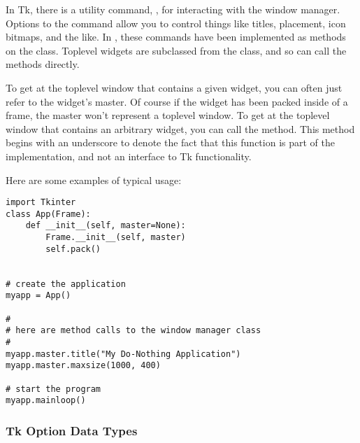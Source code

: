 In Tk, there is a utility command, , for interacting with the
window manager.  Options to the  command allow you to control
things like titles, placement, icon bitmaps, and the like.  In
, these commands have been implemented as methods
on the  class.  Toplevel widgets are subclassed from the
 class, and so can call the  methods directly.


To get at the toplevel window that contains a given widget, you can
often just refer to the widget's master.  Of course if the widget has
been packed inside of a frame, the master won't represent a toplevel
window.  To get at the toplevel window that contains an arbitrary
widget, you can call the  method.  This
method begins with an underscore to denote the fact that this function
is part of the implementation, and not an interface to Tk functionality.

Here are some examples of typical usage:

\begin{verbatim}
import Tkinter
class App(Frame):
    def __init__(self, master=None):
        Frame.__init__(self, master)
        self.pack()


# create the application
myapp = App()

#
# here are method calls to the window manager class
#
myapp.master.title("My Do-Nothing Application")
myapp.master.maxsize(1000, 400)

# start the program
myapp.mainloop()
\end{verbatim}


\subsubsection{Tk Option Data Types} %


